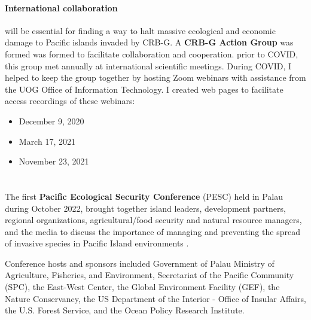 \begin{refsection}
%
%

\paragraph{International collaboration} will be essential for finding a way to halt massive ecological and economic damage to Pacific islands invaded by CRB-G. A \textbf{CRB-G Action Group} was formed was formed to facilitate collaboration and cooperation. prior to COVID, this group met annually at international scientific meetings. During COVID, I helped to keep the group together by hosting Zoom webinars with assistance from the UOG Office of Information Technology. I created web pages to facilitate access recordings of these webinars: 
\begin{itemize}
	\item December 9, 2020 \cite{moore_video_2020}
	\item March 17, 2021 \cite{moore_video_2021-1}
	\item November 23, 2021 \cite{moore_video_2021}	
\end{itemize}

\section{}

The first \textbf{Pacific Ecological Security Conference} (PESC) held in Palau during October 2022, brought together island leaders, development partners, regional organizations, agricultural/food security and natural resource managers, and the media to discuss the importance of managing and preventing the spread of invasive species in Pacific Island environments \cite{anonymousFirstPacificEcological2022}.

Conference hosts and sponsors included Government of Palau Ministry of Agriculture, Fisheries, and Environment, Secretariat of the Pacific Community (SPC), the East-West Center, the Global Environment Facility (GEF), the Nature Conservancy, the US Department of the Interior - Office of Insular Affairs, the U.S. Forest Service, and the Ocean Policy Research Institute.


\end{refsection}

